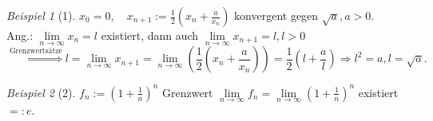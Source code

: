 \documentclass[12pt,a4paper,titlepage]{article} %
\theoremstyle{definition}
\theoremstyle{remark}
\newtheorem*{bsp}{Beispiel}
\begin{document}
\begin{bsp}[1]
	\(x_0 = 0, \quad x_{n+1} := \frac{1}{2} \left( x_n + \frac{a}{x_n} \right) \) konvergent gegen \(\sqrt{a}, a>0 \).\\
	Ang.: \( \lim\limits_{n\rightarrow\infty} x_n = l \) existiert, dann auch \( \lim\limits_{n\rightarrow\infty} x_{n+1} = l, l>0 \)
	\[ \overset{\text{Grenzwertsätze}}{\Longrightarrow} l = \lim\limits_{n\rightarrow\infty} x_{n+1} = \lim\limits_{n\rightarrow\infty} \left( \frac{1}{2} \left(x_n + \frac{a}{x_n} \right) \right) = \frac{1}{2} \left( l + \frac{a}{l} \right) \Rightarrow l^2 = a, l = \sqrt{a}. \]
\end{bsp}
\begin{bsp}[2]
	\(f_n := \left( 1 + \frac{1}{n} \right)^n \) Grenzwert \( \lim\limits_{n\rightarrow\infty} f_n = \lim\limits_{n\rightarrow\infty} \left( 1 + \frac{1}{n} \right)^n \) existiert \( =: e \).
\end{bsp}
\end{document}

